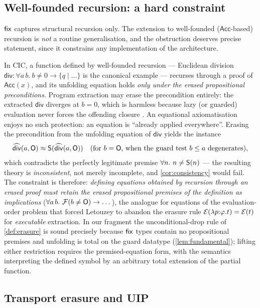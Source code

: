 \subsection{Well-founded recursion: a hard constraint}
\label{sec:limitations-wf}

$\mathsf{fix}$ captures structural recursion only.  The extension to
well-founded ($\mathsf{Acc}$-based) recursion is \emph{not} a routine
generalisation, and the obstruction deserves precise statement, since it
constrains any implementation of the architecture.

In CIC, a function defined by well-founded recursion --- Euclidean
division $\mathsf{div} : \forall a\,b.\ b \neq 0 \to \{q \mid \dots\}$
is the canonical example --- recurses through a proof of
$\mathsf{Acc}(x)$, and its unfolding equation holds \emph{only under the
erased propositional preconditions}.  Program extraction may erase the
precondition entirely: the extracted $\mathsf{div}$ diverges at $b = 0$,
which is harmless because lazy (or guarded) evaluation never forces the
offending closure \cite[\S 2.6]{Letouzey2004,Letouzey2003}.  An
equational axiomatisation enjoys no such protection: an equation is
``already applied everywhere''.  Erasing the precondition from the
unfolding equation of $\mathsf{div}$ yields the instance
\[
  \widehat{\mathsf{div}}(a, \mathsf{O}) \approx \mathsf{S}(\widehat{\mathsf{div}}(a, \mathsf{O}))
  \quad\text{(for } b = \mathsf{O}\text{, when the guard test } b \leq a
  \text{ degenerates)},
\]
which contradicts the perfectly legitimate premise $\forall n.\ n \neq
\mathsf{S}(n)$ --- the resulting theory is \emph{inconsistent}, not merely
incomplete, and \cref{cor:consistency} would fail.  The constraint is
therefore: \emph{defining equations obtained by recursion through an
erased proof must retain the erased propositional premises of the
definition as implications} ($\forall a\,b.\ \mathcal{F}(b \neq \mathsf{O}) \to
\dots$), the analogue for equations of the evaluation-order problem
that forced Letouzey to abandon the erasure rule
$\mathcal{E}(\lambda p{:}\varphi.t) = \mathcal{E}(t)$ for \emph{executable}
extraction.  In our fragment the unconditional-drop rule of
\cref{def:erasure} is sound precisely because $\mathsf{fix}$ types contain no
propositional premises and unfolding is total on the guard datatype
(\cref{lem:fundamental}); lifting either restriction requires the
premised-equation form, with the semantics interpreting the defined
symbol by an arbitrary total extension of the partial function.

\subsection{Transport erasure and UIP}
\label{sec:limitations-transport}

